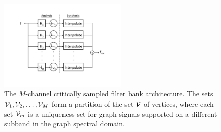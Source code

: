 \documentclass[journal, 10pt]{IEEEtran}
\begin{document}
\begin{figure}[t]
\centerline{\includegraphics[width=2.4in]{fig_mcsfb_structure3}}
\caption{The $M$-channel critically sampled filter bank architecture. The sets ${\mathcal{V}}_1, {\mathcal{V}}_2, \ldots,{\mathcal{V}}_M$ form a partition of the set ${\mathcal{V}}$ of vertices, where each set ${\mathcal{V}}_m$ is a uniqueness set for graph signals supported on a different subband in the graph spectral domain. \vspace{-.1in}}\label{Fig:arch}
\end{figure}
\end{document}

